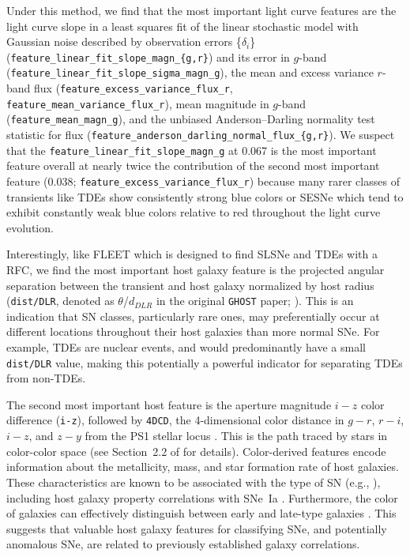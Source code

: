 \documentclass[twocolumn]{aastex63}
\begin{document}
Under this method, we find that the most important light curve features are the light curve slope in a least squares fit of the linear stochastic model with Gaussian noise described by observation errors \{$\delta_{i}$\} (\texttt{feature\_linear\_fit\_slope\_magn\_\{g,r\}}) and its error in $g$-band (\texttt{feature\_linear\_fit\_slope\_sigma\_magn\_g}), the mean and excess variance $r$-band flux (\texttt{feature\_excess\_variance\_flux\_r}, \\ \texttt{feature\_mean\_variance\_flux\_r}), mean magnitude in $g$-band (\texttt{feature\_mean\_magn\_g}), and the unbiased Anderson–Darling normality test statistic for flux (\texttt{feature\_anderson\_darling\_normal\_flux\_\{g,r\}}). We suspect that the \texttt{feature\_linear\_fit\_slope\_magn\_g} at 0.067 is the most important feature overall at nearly twice the contribution of the second most important feature (0.038; \texttt{feature\_excess\_variance\_flux\_r}) because many rarer classes of transients like TDEs show consistently strong blue colors or SESNe which tend to exhibit constantly weak blue colors relative to red throughout the light curve evolution. \par

Interestingly, like FLEET \citep{Gomez2020, Gomez2023SLSN, Gomez2023TDE} which is designed to find SLSNe and TDEs with a RFC, we find the most important host galaxy feature is the projected angular separation between the transient and host galaxy normalized by host radius (\texttt{dist/DLR}, denoted as $\theta$/$d_{DLR}$ in the original \texttt{GHOST} paper; \citealt{Gagliano2021}). This is an indication that SN classes, particularly rare ones, may preferentially occur at different locations throughout their host galaxies than more normal SNe. For example, TDEs are nuclear events, and would predominantly have a small \texttt{dist/DLR} value, making this potentially a powerful indicator for separating TDEs from non-TDEs. \par

The second most important host feature is the aperture magnitude $i-z$ color difference (\texttt{i-z}), followed by \texttt{4DCD}, the 4-dimensional color distance in $g-r$, $r-i$, $i-z$, and $z-y$ from the PS1 stellar locus \citep{Tonry2012}. This is the path traced by stars in color-color space (see Section~2.2 of \cite{Gagliano2021} for details). Color-derived features encode information about the metallicity, mass, and star formation rate of host galaxies. These characteristics are known to be associated with the type of SN (e.g., \citealt{Hansson2012}), including host galaxy property correlations with SNe~Ia \citep[e.g.,][]{Johansson2013, Henne2017, Kelsey2023}. Furthermore, the color of galaxies can effectively distinguish between early and late-type galaxies \citep{Strateva2001, Nair2010}. This suggests that valuable host galaxy features for classifying SNe, and potentially anomalous SNe, are related to previously established galaxy correlations.  \par
\end{document}
